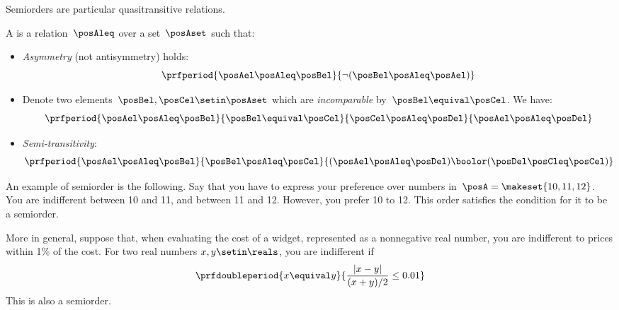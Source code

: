 Semiorders are particular quasitransitive relations.
\begin{definition}[Semiorder]\label{def:semiorder}
    A  is a relation~$\posAleq$ over a set~$\posAset$ such that:
    \begin{itemize}
        \item \emph{Asymmetry} (not antisymmetry) holds:
              \begin{equation}\label{eq:semiorder-asym}
                  \prfperiod{
                      \posAel \posAleq \posBel
                  }{
                      \neg(\posBel \posAleq \posAel)
                  }
              \end{equation}
        \item Denote two elements~$\posBel, \posCel \setin \posAset$ which are \emph{incomparable} by~$\posBel \equival \posCel$.
              We have:
              \begin{equation}\label{eq:el-incomparable}
                  \prfperiod{
                      \posAel \posAleq \posBel
                  }{
                      \posBel \equival \posCel
                  }{
                      \posCel \posAleq \posDel
                  }{
                      \posAel \posAleq \posDel
                  }
              \end{equation}
        \item \emph{Semi-transitivity}:
              \begin{equation}\label{eq:semiorder-2}
                  \prfperiod{
                      \posAel \posAleq \posBel
                  }{
                      \posBel \posAleq \posCel
                  }{
                      (\posAel \posAleq \posDel) \boolor (\posDel \posCleq \posCel)
                  }
              \end{equation}
    \end{itemize}

\end{definition}
\begin{example}
    An example of semiorder is the following.
    Say that you have to express your preference over numbers in~$\posA=\makeset{10,11,12}$.
    You are indifferent between 10 and 11, and between 11 and 12.
    However, you prefer 10 to 12.
    This order satisfies the condition for it to be a semiorder.

    More in general, suppose that, when evaluating the cost of a widget, represented as a nonnegative real number, you are indifferent to prices within 1\% of the cost.
    For two real numbers $x,y\setin\reals$, you are indifferent if
    \begin{equation}\label{eq:semiorder-tolerances}
        \prfdoubleperiod{
            x \equival y
        }{
            \frac{| x - y |}{ (x+y)/2} \leq 0.01
        }
    \end{equation}
    This is also a semiorder.
\end{example}

